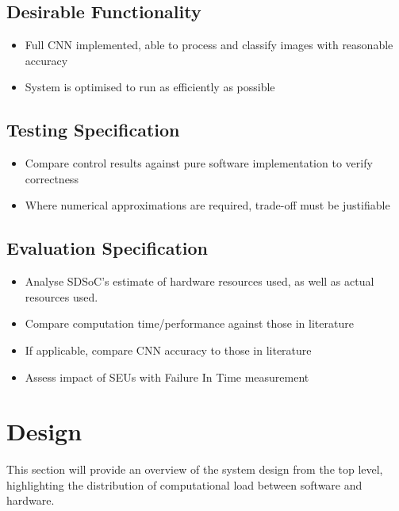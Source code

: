 \documentclass[12pt]{article}
\begin{document}
\subsection{Desirable Functionality}
\label{sec:ProjSpec-Desirable}


\begin{itemize}
\item Full CNN implemented, able to process and classify images with reasonable accuracy
\item System is optimised to run as efficiently as possible
\end{itemize}

\subsection{Testing Specification}
\label{sec:ProjSpec-TestSpec}


\begin{itemize}
\item Compare control results against pure software implementation to verify correctness
\item Where numerical approximations are required, trade-off must be justifiable
\end{itemize}

\subsection{Evaluation Specification}
\label{sec:ProjSpec-EvalSpec}


\begin{itemize}
\item Analyse SDSoC's estimate of hardware resources used, as well as actual resources used.
\item Compare computation time/performance against those in literature
\item If applicable, compare CNN accuracy to those in literature
\item Assess impact of SEUs with Failure In Time measurement
\end{itemize}

\newpage

\section{Design}
\label{sec:Design}


This section will provide an overview of the system design from the top level, highlighting the distribution of computational load between software and hardware.
\end{document}
